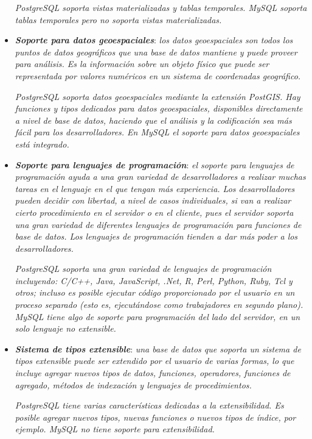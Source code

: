 \documentclass[11pt,oneside]{book}
\begin{document}
\begin{itemize}
\textit{PostgreSQL soporta vistas materializadas y tablas temporales. MySQL soporta tablas temporales pero no soporta vistas materializadas.}

\item \textit{\textbf{Soporte para datos geoespaciales}}: \textit{los datos geoespaciales son todos los puntos de datos geográficos que una base de datos mantiene y puede proveer para análisis. Es la información sobre un objeto físico que puede ser representada por valores numéricos en un sistema de coordenadas geográfico.}

\textit{PostgreSQL soporta datos geoespaciales mediante la extensión PostGIS. Hay funciones y tipos dedicados para datos geoespaciales, disponibles directamente a nivel de base de datos, haciendo que el análisis y la codificación sea más fácil para los desarrolladores. En MySQL el soporte para datos geoespaciales está integrado.}

\item \textit{\textbf{Soporte para lenguajes de programación}}: \textit{el soporte para lenguajes de programación ayuda a una gran variedad de desarrolladores a realizar muchas tareas en el lenguaje en el que tengan más experiencia. Los desarrolladores pueden decidir con libertad, a nivel de casos individuales, si van a realizar cierto procedimiento en el servidor o en el cliente, pues el servidor soporta una gran variedad de diferentes lenguajes de programación para funciones de base de datos. Los lenguajes de programación tienden a dar más poder a los desarrolladores.}

\textit{PostgreSQL soporta una gran variedad de lenguajes de programación incluyendo: C/C++, Java, JavaScript, .Net, R, Perl, Python, Ruby, Tcl y otros; incluso es posible ejecutar código proporcionado por el usuario en un proceso separado (esto es, ejecutándose como trabajadores en segundo plano). MySQL tiene algo de soporte para programación del lado del servidor, en un solo lenguaje no extensible.}

\item \textit{\textbf{Sistema de tipos extensible}}: \textit{una base de datos que soporta un sistema de tipos extensible puede ser extendido por el usuario de varias formas, lo que incluye agregar nuevos tipos de datos, funciones, operadores, funciones de agregado, métodos de indexación y lenguajes de procedimientos.}

\textit{PostgreSQL tiene varias características dedicadas a la extensibilidad. Es posible agregar nuevos tipos, nuevas funciones o nuevos tipos de índice, por ejemplo. MySQL no tiene soporte para extensibilidad.}
\end{itemize}
\end{document}
